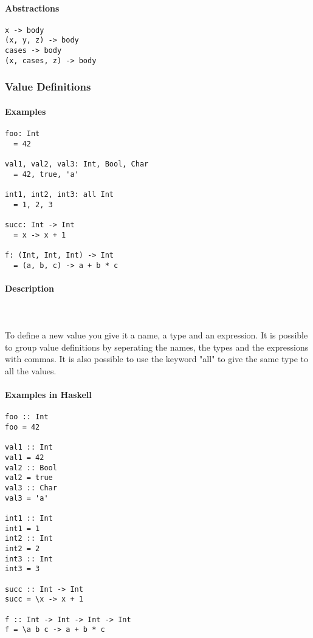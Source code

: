 \documentclass{article}
\def\H{Haskell}
\begin{document}
\paragraph{Abstractions}

\begin{verbatim}
x -> body
(x, y, z) -> body
cases -> body
(x, cases, z) -> body
\end{verbatim}

\subsubsection{Value Definitions}

\paragraph{Examples}

\begin{verbatim}
foo: Int
  = 42

val1, val2, val3: Int, Bool, Char
  = 42, true, 'a'

int1, int2, int3: all Int
  = 1, 2, 3

succ: Int -> Int
  = x -> x + 1

f: (Int, Int, Int) -> Int
  = (a, b, c) -> a + b * c
\end{verbatim}

\paragraph{Description}\mbox{} \\\\
To define a new value you give it a name, a type and an expression. It is possible
to group value definitions by seperating the names, the types and the expressions
with commas. It is also possible to use the keyword "all" to give the same type
to all the values.

\paragraph{Examples in \H}

\begin{verbatim}
foo :: Int
foo = 42

val1 :: Int
val1 = 42
val2 :: Bool
val2 = true
val3 :: Char
val3 = 'a'

int1 :: Int
int1 = 1
int2 :: Int
int2 = 2
int3 :: Int
int3 = 3

succ :: Int -> Int
succ = \x -> x + 1

f :: Int -> Int -> Int -> Int
f = \a b c -> a + b * c
\end{verbatim}
\end{document}
